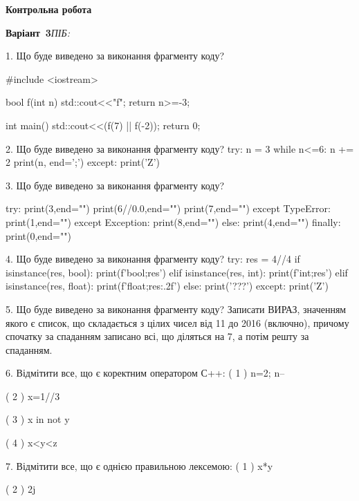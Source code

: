 \documentclass[11pt]{article}
\begin{document}
{\large\textbf{Контрольна робота}}

\textbf{Варіант \No\,3}\hfill \textit{ПІБ:}\,\underline{\hspace{60mm}}
\vspace{4mm}

1. Що буде виведено за виконання фрагменту коду?

#include <iostream>

bool f(int n){
    std::cout<<"f";
    return n>=-3;
}

int main(){
    std::cout<<(f(7) || f(-2));
    return 0;
}


2. Що буде виведено за виконання фрагменту коду?
try:
    n = 3
    while n<=6:
        n += 2
    print(n, end=';')
except:
    print('Z')


3. Що буде виведено за виконання фрагменту коду?

try:
    print(3,end="")
    print(6//0.0,end="")
    print(7,end="")
except TypeError: print(1,end="")
except Exception: print(8,end="")
else: print(4,end="")
finally: print(0,end="")


4. Що буде виведено за виконання фрагменту коду?
try:
    res = 4//4%
    if isinstance(res, bool):
        print(f'bool;{res}')
    elif isinstance(res, int):
        print(f'int;{res}')
    elif isinstance(res, float):
        print(f'float;{res:.2f}')
    else:
        print('???')
except:
    print('Z')


5. Що буде виведено за виконання фрагменту коду?
Записати ВИРАЗ, значенням якого є список, що складається з цілих чисел від 11 до 2016 (включно), причому спочатку за спаданням записано всі, що діляться на 7, а потім решту за спаданням.

6. %
Відмітити все, що є коректним оператором С++:
( 1 ) n=2; n--

( 2 ) x=1//3

( 3 ) x in not y

( 4 ) x<y<z


7. %
Відмітити все, що є однією правильною лексемою:
( 1 ) x*y

( 2 ) 2j
\end{document}
